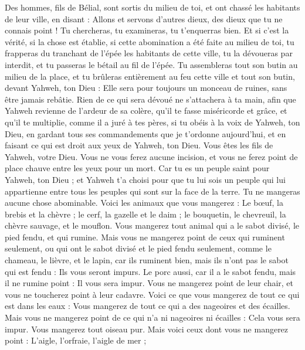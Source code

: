 \begin{multicols}{2}
Des hommes, fils de Bélial, sont sortis du milieu de toi, et ont chassé les habitants de leur ville, en disant : Allons et servons d'autres dieux, des dieux que tu ne connais point !
Tu chercheras, tu examineras, tu t’enquerras bien. Et si c’est la vérité, si la chose est établie, si cette abomination a été faite au milieu de toi,
tu frapperas du tranchant de l'épée les habitants de cette ville, tu la dévoueras par interdit, et tu passeras le bétail au fil de l'épée.
Tu assembleras tout son butin au milieu de la place, et tu brûleras entièrement au feu cette ville et tout son butin, devant Yahweh, ton Dieu : Elle sera pour toujours un monceau de ruines, sans être jamais rebâtie.
Rien de ce qui sera dévoué ne s’attachera à ta main, afin que Yahweh revienne de l’ardeur de sa colère, qu'il te fasse miséricorde et grâce, et qu'il te multiplie, comme il a juré à tes pères,
si tu obéis à la voix de Yahweh, ton Dieu, en gardant tous ses commandements que je t’ordonne aujourd'hui, et en faisant ce qui est droit aux yeux de Yahweh, ton Dieu.
\VerseOne{}Vous êtes les fils de Yahweh, votre Dieu. Vous ne vous ferez aucune incision, et vous ne ferez point de place chauve entre les yeux pour un mort.
Car tu es un peuple saint pour Yahweh, ton Dieu ; et Yahweh t'a choisi pour que tu lui sois un peuple qui lui appartienne entre tous les peuples qui sont sur la face de la terre.
Tu ne mangeras aucune chose abominable.
Voici les animaux que vous mangerez : Le bœuf, la brebis et la chèvre ;
le cerf, la gazelle et le daim ; le bouquetin, le chevreuil, la chèvre sauvage, et le mouflon.
Vous mangerez tout animal qui a le sabot divisé, le pied fendu, et qui rumine.
Mais vous ne mangerez point de ceux qui ruminent seulement, ou qui ont le sabot divisé et le pied fendu seulement, comme le chameau, le lièvre, et le lapin, car ils ruminent bien, mais ils n'ont pas le sabot qui est fendu : Ils vous seront impurs.
Le porc aussi, car il a le sabot fendu, mais il ne rumine point : Il vous sera impur. Vous ne mangerez point de leur chair, et vous ne toucherez point à leur cadavre.
Voici ce que vous mangerez de tout ce qui est dans les eaux : Vous mangerez de tout ce qui a des nageoires et des écailles.
Mais vous ne mangerez point de ce qui n'a ni nageoires ni écailles : Cela vous sera impur.
Vous mangerez tout oiseau pur.
Mais voici ceux dont vous ne mangerez point : L'aigle, l'orfraie, l’aigle de mer ;

\end{multicols}
